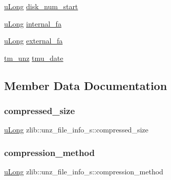 \begin{DoxyCompactItemize}
\item 
\hyperlink{namespacezlib_a3bc0123d9337acd75d286df79e6cf7da}{u\+Long} \hyperlink{structzlib_1_1unz__file__info__s_a06134fac086be2242b9558217f50639f}{disk\+\_\+num\+\_\+start}
\item 
\hyperlink{namespacezlib_a3bc0123d9337acd75d286df79e6cf7da}{u\+Long} \hyperlink{structzlib_1_1unz__file__info__s_a678c3bcbadcba240e4a888e889a08973}{internal\+\_\+fa}
\item 
\hyperlink{namespacezlib_a3bc0123d9337acd75d286df79e6cf7da}{u\+Long} \hyperlink{structzlib_1_1unz__file__info__s_adc02bf65607f5631589ae6e3411f163e}{external\+\_\+fa}
\item 
\hyperlink{namespacezlib_a98fa3246f3d786aca4a6def1a4c380ab}{tm\+\_\+unz} \hyperlink{structzlib_1_1unz__file__info__s_a3ba5fe2d3d42db291a28c21a8ab4d89c}{tmu\+\_\+date}
\end{DoxyCompactItemize}


\subsection{Member Data Documentation}
\mbox{\label{structzlib_1_1unz__file__info__s_a667de8cd07328b357bf608b9627b9447}} 
\subsubsection{\texorpdfstring{compressed\+\_\+size}{compressed\_size}}
{\footnotesize\ttfamily \hyperlink{namespacezlib_a3bc0123d9337acd75d286df79e6cf7da}{u\+Long} zlib\+::unz\+\_\+file\+\_\+info\+\_\+s\+::compressed\+\_\+size}

\mbox{\label{structzlib_1_1unz__file__info__s_a213b031437c91f65ccfb39241af8bcab}} 
\subsubsection{\texorpdfstring{compression\+\_\+method}{compression\_method}}
{\footnotesize\ttfamily \hyperlink{namespacezlib_a3bc0123d9337acd75d286df79e6cf7da}{u\+Long} zlib\+::unz\+\_\+file\+\_\+info\+\_\+s\+::compression\+\_\+method}

